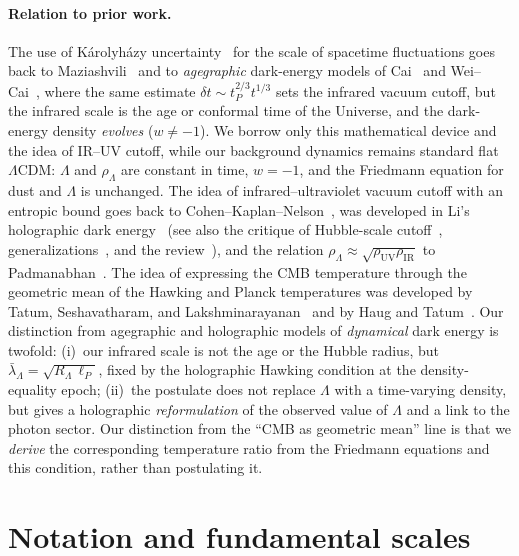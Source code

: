 \documentclass[10pt,a4paper]{article}
\begin{document}
\paragraph{Relation to prior work.} The use of K\'arolyh\'azy uncertainty~\cite{Karolyhazy1966} for the scale of spacetime fluctuations goes back to Maziashvili~\cite{Maziashvili2007} and to \emph{agegraphic} dark-energy models of Cai~\cite{Cai2007} and Wei--Cai~\cite{WeiCai2008}, where the same estimate $\delta t\sim t_P^{2/3}t^{1/3}$ sets the infrared vacuum cutoff, but the infrared scale is the age or conformal time of the Universe, and the dark-energy density \emph{evolves} ($w\neq-1$). We borrow only this mathematical device and the idea of IR--UV cutoff, while our background dynamics remains standard flat $\Lambda$CDM: $\Lambda$ and $\rho_\Lambda$ are constant in time, $w=-1$, and the Friedmann equation for dust and $\Lambda$ is unchanged. The idea of infrared--ultraviolet vacuum cutoff with an entropic bound goes back to Cohen--Kaplan--Nelson~\cite{Cohen1999}, was developed in Li's holographic dark energy~\cite{Li2004} (see also the critique of Hubble-scale cutoff~\cite{Hsu2004}, generalizations~\cite{NojiriOdintsov2006}, and the review~\cite{WangWangLi2017}), and the relation $\rho_\Lambda\approx\sqrt{\rho_{\mathrm{UV}}\rho_{\mathrm{IR}}}$ to Padmanabhan~\cite{Padmanabhan2005}. The idea of expressing the CMB temperature through the geometric mean of the Hawking and Planck temperatures was developed by Tatum, Seshavatharam, and Lakshminarayanan~\cite{Tatum2015} and by Haug and Tatum~\cite{Haug2024}. Our distinction from agegraphic and holographic models of \emph{dynamical} dark energy is twofold: (i)~our infrared scale is not the age or the Hubble radius, but $\bar\lambda_\Lambda=\sqrt{R_\Lambda\,\ell_P}$, fixed by the holographic Hawking condition at the density-equality epoch; (ii)~the postulate does not replace $\Lambda$ with a time-varying density, but gives a holographic \emph{reformulation} of the observed value of $\Lambda$ and a link to the photon sector. Our distinction from the ``CMB as geometric mean'' line is that we \emph{derive} the corresponding temperature ratio from the Friedmann equations and this condition, rather than postulating it.

\section{Notation and fundamental scales}
\end{document}

